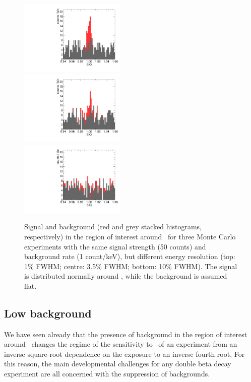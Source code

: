 \documentclass{PoS}
\begin{document}
\begin{figure}
\centering
\includegraphics[width=0.45\textwidth]{img/ROI_SNR_1.pdf}\\
\includegraphics[width=0.45\textwidth]{img/ROI_SNR_3.pdf}\\
\includegraphics[width=0.45\textwidth]{img/ROI_SNR_10.pdf}
\caption{Signal and background (red and grey stacked histograms, respectively) in the region of interest around \Qbb\ for three Monte Carlo experiments with the same signal strength (50 counts) and background rate (1 count/keV), but different energy resolution (top: 1\% FWHM; centre: 3.5\% FWHM; bottom: 10\% FWHM). The signal is distributed normally around \Qbb, while the background is assumed flat.} \label{fig:EnergyResolutionSNR}
\end{figure}


\subsection{Low background} \label{subsec:Backgrounds}
We have seen already that the  presence of background in the region of interest around \Qbb\ changes the regime of the sensitivity to \mbb\ of an experiment from an inverse square-root dependence on the exposure to an inverse fourth root. For this reason, the main developmental challenges for any double beta decay experiment are all concerned with the suppression of backgrounds. 
\end{document}
